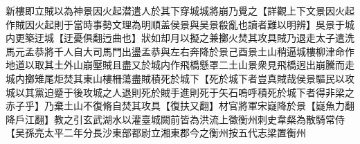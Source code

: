 新樓即立賊以為神景因火起潜遣人於其下穿城城將崩乃覺之【詳觀上下文景因火起作賊因火起則于當時事勢文理為明順盖侯景與吴景殽亂也讀者難以明辨】吳景于城内更築迂城【迂憂俱翻迃曲也】狀如却月以擬之兼擲火焚其攻具賊乃退走太子遣洗馬元孟恭將千人自大司馬門出盪孟恭與左右奔降於景己酉景土山稍逼城樓柳津命作地道以取其土外山崩壓賊且盡又於城内作飛橋懸罩二土山景衆見飛橋迥出崩騰而走城内擲雉尾炬焚其東山樓柵蕩盡賊積死於城下【死於城下者豈真賊哉侯景驅民以攻城以其黨迫蹙于後攻城之人退則死於賊手進則死于矢石嗚呼積死於城下者得非梁之赤子乎】乃棄土山不復脩自焚其攻具【復扶又翻】材官將軍宋嶷降於景【嶷魚力翻降戶江翻】教之引玄武湖水以灌臺城闕前皆為洪流上徵衡州刺史韋粲為散騎常侍【吴孫亮太平二年分長沙東部都尉立湘東郡今之衡州按五代志梁置衡州